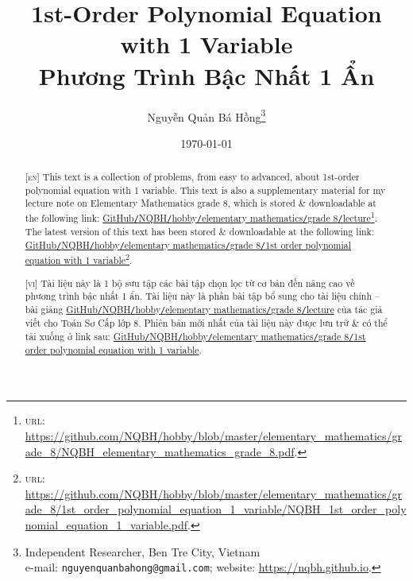 \documentclass{article}
\title{1st-Order Polynomial Equation with 1 Variable\\Phương Trình Bậc Nhất 1 Ẩn}
\author{Nguyễn Quản Bá Hồng\footnote{Independent Researcher, Ben Tre City, Vietnam\\e-mail: \texttt{nguyenquanbahong@gmail.com}; website: \url{https://nqbh.github.io}.}}
\date{\today}
\numberwithin{equation}{section}
\begin{document}
\maketitle
\begin{abstract}
	\textsc{[en]} This text is a collection of problems, from easy to advanced, about 1st-order polynomial equation with 1 variable. This text is also a supplementary material for my lecture note on Elementary Mathematics grade 8, which is stored \& downloadable at the following link: \href{https://github.com/NQBH/hobby/blob/master/elementary_mathematics/grade_8/NQBH_elementary_mathematics_grade_8.pdf}{GitHub\texttt{/}NQBH\texttt{/}hobby\texttt{/}elementary mathematics\texttt{/}grade 8\texttt{/}lecture}\footnote{\textsc{url}: \url{https://github.com/NQBH/hobby/blob/master/elementary_mathematics/grade_8/NQBH_elementary_mathematics_grade_8.pdf}.}. The latest version of this text has been stored \& downloadable at the following link: \href{https://github.com/NQBH/hobby/blob/master/elementary_mathematics/grade_8/1st_order_polynomial_equation_1_variable/NQBH_1st_order_polynomial_equation_1_variable.pdf}{GitHub\texttt{/}NQBH\texttt{/}hobby\texttt{/}elementary mathematics\texttt{/}grade 8\texttt{/}1st order polynomial equation with 1 variable}\footnote{\textsc{url}: \url{https://github.com/NQBH/hobby/blob/master/elementary_mathematics/grade_8/1st_order_polynomial_equation_1_variable/NQBH_1st_order_polynomial_equation_1_variable.pdf}.}.
	\vspace{2mm}
	
	\textsc{[vi]} Tài liệu này là 1 bộ sưu tập các bài tập chọn lọc từ cơ bản đến nâng cao về phương trình bậc nhất 1 ẩn. Tài liệu này là phần bài tập bổ sung cho tài liệu chính -- bài giảng \href{https://github.com/NQBH/hobby/blob/master/elementary_mathematics/grade_8/NQBH_elementary_mathematics_grade_8.pdf}{GitHub\texttt{/}NQBH\texttt{/}hobby\texttt{/}elementary mathematics\texttt{/}grade 8\texttt{/}lecture} của tác giả viết cho Toán Sơ Cấp lớp 8. Phiên bản mới nhất của tài liệu này được lưu trữ \& có thể tải xuống ở link sau: \href{https://github.com/NQBH/hobby/blob/master/elementary_mathematics/grade_8/1st_order_polynomial_equation_1_variable/NQBH_1st_order_polynomial_equation_1_variable.pdf}{GitHub\texttt{/}NQBH\texttt{/}hobby\texttt{/}elementary mathematics\texttt{/}grade 8\texttt{/}1st order polynomial equation with 1 variable}.
\end{abstract}
\setcounter{secnumdepth}{4}
\setcounter{tocdepth}{3}
\tableofcontents
\newpage

\end{document}
